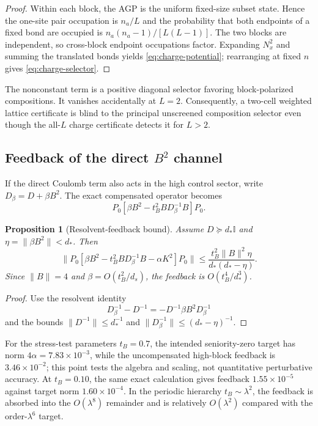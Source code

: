 \documentclass[11pt]{article}
\newtheorem{proposition}[theorem]{Proposition}
\theoremstyle{definition}
\theoremstyle{remark}
\newcommand{\Id}{\mathbb I}
\newcommand{\norm}[1]{\lVert #1\rVert}
\begin{document}
\begin{proof}
Within each block, the AGP is the uniform fixed-size subset state.  Hence the one-site pair occupation is $n_a/L$ and the probability that both endpoints of a fixed bond are occupied is $n_a(n_a-1)/[L(L-1)]$.  The two blocks are independent, so cross-block endpoint occupations factor.  Expanding $N_x^2$ and summing the translated bonds yields \eqref{eq:charge-potential}; rearranging at fixed $n$ gives \eqref{eq:charge-selector}.
\end{proof}

The nonconstant term is a positive diagonal selector favoring block-polarized compositions.  It vanishes accidentally at $L=2$.  Consequently, a two-cell weighted lattice certificate is blind to the principal unscreened composition selector even though the all-$L$ charge certificate detects it for $L>2$.

\subsection{Feedback of the direct \texorpdfstring{$B^2$}{B-squared} channel}

If the direct Coulomb term also acts in the high control sector, write $D_\beta=D+\beta B^2$.  The exact compensated operator becomes
\begin{equation}
 P_0[\beta B^2-t_B^2BD_\beta^{-1}B]P_0.
\end{equation}

\begin{proposition}[Resolvent-feedback bound]
\label{prop:feedback}
Assume $D\succeq d_*\Id$ and $\eta=\norm{\beta B^2}<d_*$.  Then
\begin{equation}
\boxed{
\norm{P_0[\beta B^2-t_B^2BD_\beta^{-1}B-\alpha K^2]P_0}
\le\frac{t_B^2\norm{B}^2\eta}{d_*(d_*-\eta)}.
}
\label{eq:feedback-bound}
\end{equation}
Since $\norm{B}=4$ and $\beta=O(t_B^2/d_s)$, the feedback is $O(t_B^4/d_*^3)$.
\end{proposition}

\begin{proof}
Use the resolvent identity
\begin{equation}
 D_\beta^{-1}-D^{-1}=-D^{-1}\beta B^2D_\beta^{-1}
\end{equation}
and the bounds $\norm{D^{-1}}\le d_*^{-1}$ and $\norm{D_\beta^{-1}}\le(d_*-\eta)^{-1}$.
\end{proof}

For the stress-test parameters $t_B=0.7$, the intended seniority-zero target has norm $4\alpha=7.83\times10^{-3}$, while the uncompensated high-block feedback is $3.46\times10^{-2}$; this point tests the algebra and scaling, not quantitative perturbative accuracy.  At $t_B=0.10$, the same exact calculation gives feedback $1.55\times10^{-5}$ against target norm $1.60\times10^{-4}$.  In the periodic hierarchy $t_B\sim\lambda^2$, the feedback is absorbed into the $O(\lambda^8)$ remainder and is relatively $O(\lambda^2)$ compared with the order-$\lambda^6$ target.
\end{document}
